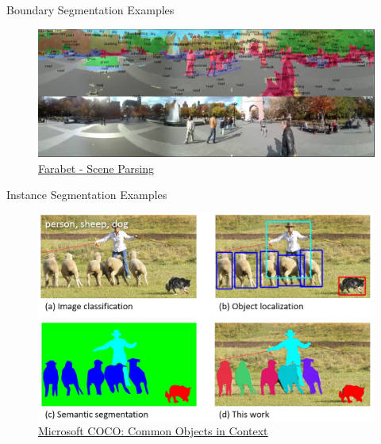 \documentclass[handout]{beamer}
\begin{document}
\begin{frame}{Boundary Segmentation Examples}
\begin{figure}
\includegraphics[width=\textwidth]{../media/park-nyu-2-parsed.png}
\caption{\href{http://www.clement.farabet.net/research.html\#parsing}{\color{blue} Farabet - Scene Parsing}}
\end{figure}
\end{frame}


\begin{frame}{Instance Segmentation Examples}
\begin{figure}
\includegraphics[width=\textwidth]{../media/coco_1.png}
\caption{\href{https://research.fb.com/learning-to-segment/}{\color{blue}Microsoft COCO: Common Objects in Context}}
\end{figure}
\end{frame}
\end{document}
